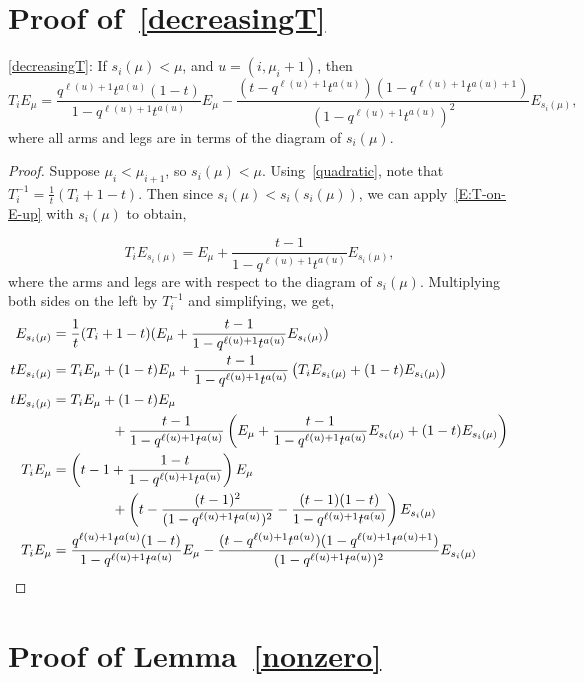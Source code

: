 \documentclass[ALCO]{cedram}
\begin{document}
\section{\texorpdfstring{Proof of~\eqref{decreasingT}}{Proof of (6)}} 
\eqref{decreasingT}: If $s_i(\mu)<\mu$, and $u=(i,\mu_{i}+1)$, then
\[ T_iE_\mu = \frac{q^{\ell(u)+1}t^{a(u)}(1-t)}{1-q^{\ell(u)+1}t^{a(u)}}E_{\mu} - \frac{(t-q^{\ell(u)+1}t^{a(u)})(1-q^{\ell(u)+1}t^{a(u)+1})}{(1-q^{\ell(u)+1}t^{a(u)})^2} E_{s_i(\mu)},\]
where all arms and legs are in terms of the diagram of $s_i(\mu)$.
\begin{proof}
Suppose $\mu_i < \mu_{i+1}$, so  $s_i(\mu)<\mu$. Using~\eqref{quadratic}, note that $T_i^{-1} = \frac{1}{t}(T_i+1-t)$. Then since $s_i(\mu)<s_i(s_i(\mu))$, we can apply~\eqref{E:T-on-E-up} with $s_i(\mu)$ to obtain,

\[ T_i E_{s_i(\mu)} = E_\mu + \frac{t-1}{1-q^{\ell(u)+1}t^{a(u)}} E_{s_i(\mu)},\]
where the arms and legs are with respect to the diagram of $s_i(\mu)$. Multiplying both sides on the left by $T_i^{-1}$ and simplifying, we get,
\begin{align*}
E_{s_i(\mu)} &= \frac{1}{t}(T_i+1-t)(E_\mu + \frac{t-1}{1-q^{\ell(u)+1}t^{a(u)}}E_{s_i(\mu)})\\
tE_{s_i(\mu)} &= T_i E_\mu + (1-t) E_\mu + \frac{t-1}{1-q^{\ell(u)+1}t^{a(u)}} \left(T_i E_{s_i(\mu)} + (1-t) E_{s_i(\mu)} \right)\\
tE_{s_i(\mu)} &= T_i E_\mu + (1-t) E_\mu \\ &\hspace*{1.5cm} +\frac{t-1}{1-q^{\ell(u)+1}t^{a(u)}} \left( E_\mu + \frac{t-1}{1-q^{\ell(u)+1}t^{a(u)}} E_{s_i(\mu)} + (1-t) E_{s_i(\mu)} \right)\\
T_i E_\mu &= \left(t-1+\frac{1-t}{1-q^{\ell(u)+1}t^{a(u)}} \right) E_\mu \\ &\hspace*{1.5cm} + \left(t-\frac{(t-1)^2}{(1-q^{\ell(u)+1}t^{a(u)})^2} - \frac{(t-1)(1-t)}{1-q^{\ell(u)+1}t^{a(u)}} \right) E_{s_i(\mu)}\\
T_iE_\mu &= \frac{q^{\ell(u)+1}t^{a(u)}(1-t)}{1-q^{\ell(u)+1}t^{a(u)}}E_{\mu} - \frac{(t-q^{\ell(u)+1}t^{a(u)})(1-q^{\ell(u)+1}t^{a(u)+1})}{(1-q^{\ell(u)+1}t^{a(u)})^2} E_{s_i(\mu)}\qedhere
\end{align*}
\end{proof}


\section{Proof of Lemma~\ref{nonzero}}
\end{document}
